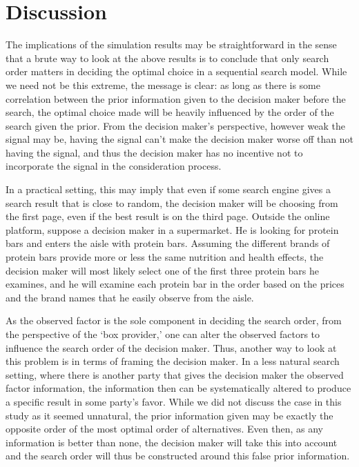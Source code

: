 \documentclass[12pt]{article}
\begin{document}
\section{Discussion}
The implications of the simulation results may be straightforward in the sense that a brute way to look at the above results is to conclude that only search order matters in deciding the optimal choice in a sequential search model. While we need not be this extreme, the message is clear: as long as there is some correlation between the prior information given to the decision maker before the search, the optimal choice made will be heavily influenced by the order of the search given the prior. From the decision maker's perspective, however weak the signal may be, having the signal can't make the decision maker worse off than not having the signal, and thus the decision maker has no incentive not to incorporate the signal in the consideration process.

In a practical setting, this may imply that even if some search engine gives a search result that is close to random, the decision maker will be choosing from the first page, even if the best result is on the third page. Outside the online platform, suppose a decision maker in a supermarket. He is looking for protein bars and enters the aisle with protein bars. Assuming the different brands of protein bars provide more or less the same nutrition and health effects, the decision maker will most likely select one of the first three protein bars he examines, and he will examine each protein bar in the order based on the prices and the brand names that he easily observe from the aisle.

As the observed factor is the sole component in deciding the search order, from the perspective of the `box provider,' one can alter the observed factors to influence the search order of the decision maker. Thus, another way to look at this problem is in terms of framing the decision maker. In a less natural search setting, where there is another party that gives the decision maker the observed factor information, the information then can be systematically altered to produce a specific result in some party's favor. While we did not discuss the case in this study as it seemed unnatural, the prior information given may be exactly the opposite order of the most optimal order of alternatives. Even then, as any information is better than none, the decision maker will take this into account and the search order will thus be constructed around this false prior information.
\end{document}

